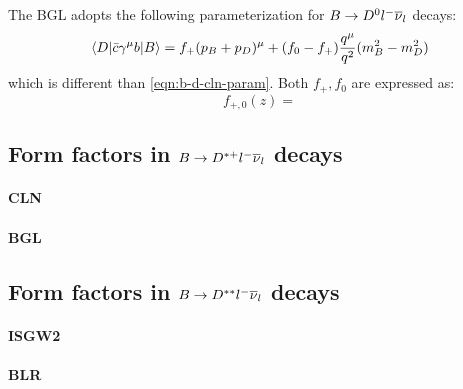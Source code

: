 The BGL adopts the following parameterization for
$B \rightarrow {\ensuremath{{D}^0}}{\ensuremath{l^-}}{\ensuremath{{\overline{\nu}}_l}}$ decays:
\begin{equation}
    \langle D\rvert \bar{c} \gamma^\mu b \lvert B\rangle =
    f_+ (p_B + p_D)^\mu + (f_0 - f_+) \frac{q^\mu}{q^2} (m^2_B - m^2_D)
\end{equation}
which is different than \cref{eqn:b-d-cln-param}.
Both $f_+, f_0$ are expressed as:
\begin{equation}
    f_{+,0}(z) =
\end{equation}

\subsection{Form factors in $B \rightarrow {\ensuremath{{D}^{*+}}}{\ensuremath{l^-}}{\ensuremath{{\overline{\nu}}_l}}$ decays}

\paragraph{CLN}

\paragraph{BGL}


\subsection{Form factors in $B \rightarrow D^{**}{l^-}{{\overline{\nu}}_l}$ decays}
\label{ref:theory:ff-dstst}

\paragraph{ISGW2}

\paragraph{BLR}
